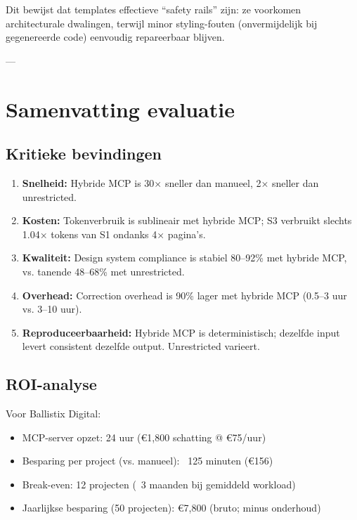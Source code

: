 Dit bewijst dat templates effectieve ``safety rails'' zijn: ze voorkomen architecturale dwalingen, terwijl minor styling-fouten (onvermijdelijk bij gegenereerde code) eenvoudig repareerbaar blijven.

---

\section{Samenvatting evaluatie}

\subsection{Kritieke bevindingen}

\begin{enumerate}
  \item \textbf{Snelheid:} Hybride MCP is 30× sneller dan manueel, 2× sneller dan unrestricted.
  
  \item \textbf{Kosten:} Tokenverbruik is sublineair met hybride MCP; S3 verbruikt slechts 1.04× tokens van S1 ondanks 4× pagina's.
  
  \item \textbf{Kwaliteit:} Design system compliance is stabiel 80--92\% met hybride MCP, vs. tanende 48--68\% met unrestricted.
  
  \item \textbf{Overhead:} Correction overhead is 90\% lager met hybride MCP (0.5--3 uur vs. 3--10 uur).
  
  \item \textbf{Reproduceerbaarheid:} Hybride MCP is deterministisch; dezelfde input levert consistent dezelfde output. Unrestricted varieert.
\end{enumerate}

\subsection{ROI-analyse}

Voor Ballistix Digital:

\begin{itemize}
  \item MCP-server opzet: 24 uur (€1,800 schatting @ €75/uur)
  \item Besparing per project (vs. manueel): ~125 minuten (€156)
  \item Break-even: 12 projecten (~3 maanden bij gemiddeld workload)
  \item Jaarlijkse besparing (50 projecten): €7,800 (bruto; minus onderhoud)
\end{itemize}

